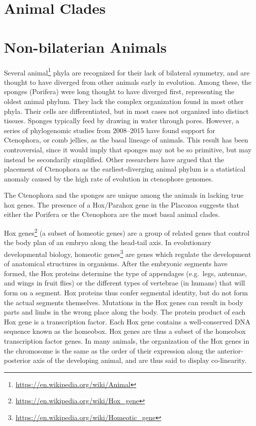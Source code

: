 \documentclass[]{book}
\let\rmarkdownfootnote\footnote%
\def\footnote{\protect\rmarkdownfootnote}
\renewcommand{\href}[2]{#2\footnote{\url{#1}}}
\theoremstyle{definition}
\theoremstyle{definition}
\theoremstyle{definition}
\theoremstyle{remark}
\begin{document}
\section{Animal Clades}\label{animal-clades}

\section{Non-bilaterian Animals}\label{non-bilaterian-animals}

Several \href{https://en.wikipedia.org/wiki/Animal}{animal} phyla are
recognized for their lack of bilateral symmetry, and are thought to have
diverged from other animals early in evolution. Among these, the sponges
(Porifera) were long thought to have diverged first, representing the
oldest animal phylum. They lack the complex organization found in most
other phyla. Their cells are differentiated, but in most cases not
organized into distinct tissues. Sponges typically feed by drawing in
water through pores. However, a series of phylogenomic studies from
2008--2015 have found support for Ctenophora, or comb jellies, as the
basal lineage of animals. This result has been controversial, since it
would imply that sponges may not be so primitive, but may instead be
secondarily simplified. Other researchers have argued that the placement
of Ctenophora as the earliest-diverging animal phylum is a statistical
anomaly caused by the high rate of evolution in ctenophore genomes.

The Ctenophora and the sponges are unique among the animals in lacking
true hox genes. The presence of a Hox/Parahox gene in the Placozoa
suggests that either the Porifera or the Ctenophora are the most basal
animal clades.

\href{https://en.wikipedia.org/wiki/Hox_gene}{Hox genes} (a subset of
homeotic genes) are a group of related genes that control the body plan
of an embryo along the head-tail axis. In evolutionary developmental
biology, \href{https://en.wikipedia.org/wiki/Homeotic_gene}{homeotic genes} are genes which regulate the development of
anatomical structures in organisms. After the embryonic segments have
formed, the Hox proteins determine the type of appendages (e.g.~legs,
antennae, and wings in fruit flies) or the different types of vertebrae
(in humans) that will form on a segment. Hox proteins thus confer
segmental identity, but do not form the actual segments themselves.
Mutations in the Hox genes can result in body parts and limbs in the
wrong place along the body. The protein product of each Hox gene is a
transcription factor. Each Hox gene contains a well-conserved DNA
sequence known as the homeobox. Hox genes are thus a subset of the
homeobox transcription factor genes. In many animals, the organization
of the Hox genes in the chromosome is the same as the order of their
expression along the anterior-posterior axis of the developing animal,
and are thus said to display co-linearity.
\end{document}
